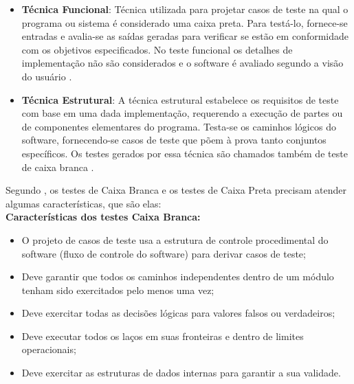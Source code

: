 \begin{itemize}
    \item \textbf{Técnica Funcional}: Técnica utilizada para projetar casos de teste na qual o programa ou sistema é considerado uma caixa preta. Para testá-lo, fornece-se entradas e avalia-se as saídas geradas para verificar se estão em conformidade com os objetivos especificados. No teste funcional os detalhes de implementação não são considerados e o software é avaliado segundo a visão do usuário \cite{DELAMARO2007}.
    
    
    
    
    \item \textbf{Técnica Estrutural}: A técnica estrutural estabelece os requisitos de teste com base em uma dada implementação, requerendo a execução de partes ou de componentes elementares do programa. Testa-se os caminhos lógicos do software, fornecendo-se casos de teste que põem à prova tanto conjuntos específicos. Os testes gerados por essa técnica são chamados também de teste de caixa branca \cite{DELAMARO2007}.
    
    
\end{itemize}

Segundo , os testes de Caixa Branca e os testes de Caixa Preta precisam atender algumas características, que são elas:\\

\textbf{Características dos testes Caixa Branca:}

\begin{itemize}
    \item O projeto de casos de teste usa a estrutura de controle procedimental do software (fluxo de controle do software) para derivar casos de teste;
    \item Deve garantir que todos os caminhos independentes dentro de um módulo tenham sido exercitados pelo menos uma vez;
    \item Deve exercitar todas as decisões lógicas para valores falsos ou verdadeiros;
    \item Deve executar todos os laços em suas fronteiras e dentro de limites operacionais;
    \item Deve exercitar as estruturas de dados internas para garantir a sua validade.
\end{itemize}




